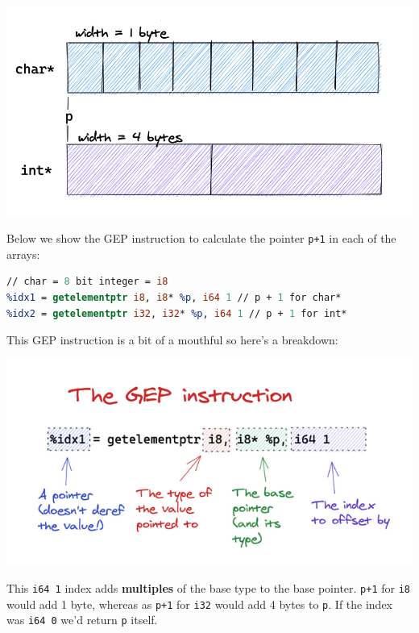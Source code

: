 {
\href{https://mukulrathi.com/static/72077af5568512fb3538183382b672b0/a9577/pointer-offset.png}{{}
\includegraphics[width=\linewidth]{08_files/pointer-offset.png}} }

Below we show the GEP instruction to calculate the pointer \texttt{p+1}
in each of the arrays:


\begin{lstlisting}[language=llvm]
// char = 8 bit integer = i8
%idx1 = getelementptr i8, i8* %p, i64 1 // p + 1 for char*
%idx2 = getelementptr i32, i32* %p, i64 1 // p + 1 for int*
\end{lstlisting}

This GEP instruction is a bit of a mouthful so here's a breakdown:

{
\href{https://mukulrathi.com/static/c54f577c6586b64d172044af4f8aacd1/79166/gep-int.png}{{}
\includegraphics[width=\linewidth]{08_files/gep-int.png}} }

This \texttt{i64\ 1} index adds \textbf{multiples} of the base type to
the base pointer. \texttt{p+1} for \texttt{i8} would add 1 byte, whereas
as \texttt{p+1} for \texttt{i32} would add 4 bytes to \texttt{p}. If the
index was \texttt{i64\ 0} we'd return \texttt{p} itself.

